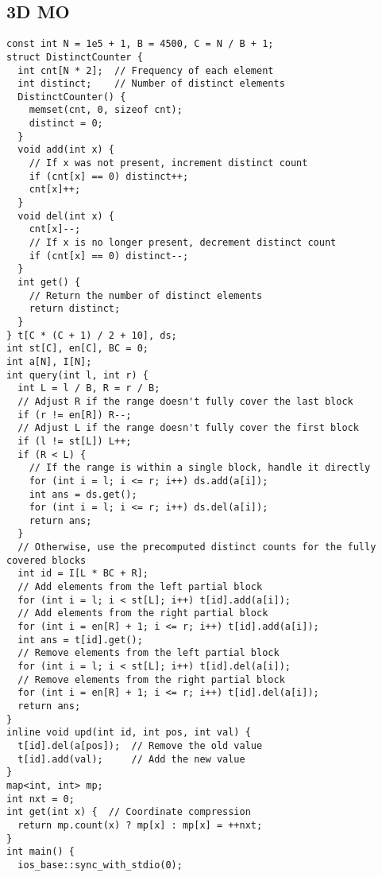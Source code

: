 \documentclass[twoside]{article}
\begin{document}
\begin{multicols*}{2}
\begin{verbatim}
\end{verbatim}

{
\subsection*{3D MO}
}
\begin{verbatim}
const int N = 1e5 + 1, B = 4500, C = N / B + 1;
struct DistinctCounter {
  int cnt[N * 2];  // Frequency of each element
  int distinct;    // Number of distinct elements
  DistinctCounter() {
    memset(cnt, 0, sizeof cnt);
    distinct = 0;
  }
  void add(int x) {
    // If x was not present, increment distinct count
    if (cnt[x] == 0) distinct++;
    cnt[x]++;
  }
  void del(int x) {
    cnt[x]--;
    // If x is no longer present, decrement distinct count
    if (cnt[x] == 0) distinct--;
  }
  int get() {
    // Return the number of distinct elements
    return distinct;
  }
} t[C * (C + 1) / 2 + 10], ds;
int st[C], en[C], BC = 0;
int a[N], I[N];
int query(int l, int r) {
  int L = l / B, R = r / B;
  // Adjust R if the range doesn't fully cover the last block
  if (r != en[R]) R--;
  // Adjust L if the range doesn't fully cover the first block
  if (l != st[L]) L++;
  if (R < L) {
    // If the range is within a single block, handle it directly
    for (int i = l; i <= r; i++) ds.add(a[i]);
    int ans = ds.get();
    for (int i = l; i <= r; i++) ds.del(a[i]);
    return ans;
  }
  // Otherwise, use the precomputed distinct counts for the fully covered blocks
  int id = I[L * BC + R];
  // Add elements from the left partial block
  for (int i = l; i < st[L]; i++) t[id].add(a[i]);
  // Add elements from the right partial block
  for (int i = en[R] + 1; i <= r; i++) t[id].add(a[i]);
  int ans = t[id].get();
  // Remove elements from the left partial block
  for (int i = l; i < st[L]; i++) t[id].del(a[i]);
  // Remove elements from the right partial block
  for (int i = en[R] + 1; i <= r; i++) t[id].del(a[i]);
  return ans;
}
inline void upd(int id, int pos, int val) {
  t[id].del(a[pos]);  // Remove the old value
  t[id].add(val);     // Add the new value
}
map<int, int> mp;
int nxt = 0;
int get(int x) {  // Coordinate compression
  return mp.count(x) ? mp[x] : mp[x] = ++nxt;
}
int main() {
  ios_base::sync_with_stdio(0);

\end{verbatim}
\end{multicols*}
\end{document}
